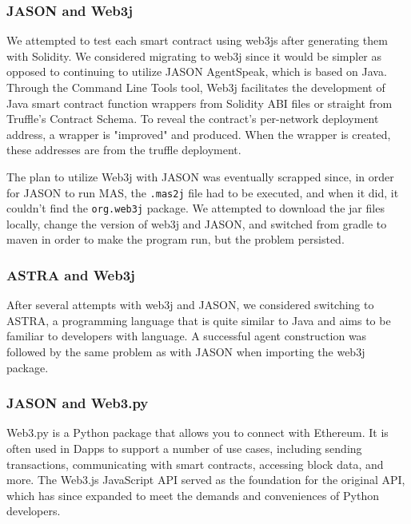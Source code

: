 \subsubsection{JASON and Web3j}

We attempted to test each smart contract using web3js after generating them with Solidity. We considered migrating to web3j since it would be simpler as opposed to continuing to utilize JASON AgentSpeak, which is based on Java. Through the Command Line Tools tool, Web3j facilitates the development of Java smart contract function wrappers from Solidity ABI files or straight from Truffle's Contract Schema. To reveal the contract's per-network deployment address, a wrapper is "improved" and produced. When the wrapper is created, these addresses are from the truffle deployment.

\vspace{.5cm}

The plan to utilize Web3j with JASON was eventually scrapped since, in order for JASON to run \ac{MAS}, the \texttt{.mas2j} file had to be executed, and when it did, it couldn't find the \texttt{org.web3j} package. We attempted to download the jar files locally, change the version of web3j and JASON, and switched from gradle to maven in order to make the program run, but the problem persisted.

\subsubsection{ASTRA and Web3j}

After several attempts with web3j and JASON, we considered switching to \ac{ASTRA}, a programming language that is quite similar to Java and aims to be familiar to developers with language. A successful agent construction was followed by the same problem as with JASON when importing the web3j package.

\subsubsection{JASON and Web3.py}

Web3.py is a Python package that allows you to connect with Ethereum. It is often used in \ac{Dapp}s to support a number of use cases, including sending transactions, communicating with smart contracts, accessing block data, and more. The Web3.js JavaScript \ac{API} served as the foundation for the original \ac{API}, which has since expanded to meet the demands and conveniences of Python developers.

